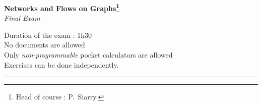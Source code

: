 \documentclass[12pt,a4paper]{article}
\begin{document}
\begin{center}

  {\Large \textbf{Networks and Flows on Graphs\footnote{Head of course : P.~Siarry.}}}\\

  \vspace{10pt}
  {\Large \textit{Final Exam}}

  \vspace{2\baselineskip}
\end{center}
\begin{center}
\begin{minipage}{\textwidth}
  Duration of the exam : 1h30\\
  No documents are allowed\\
  Only \emph{non-programmable} pocket calculators are allowed\\
  Exercises can be done independently.
\end{minipage}
\end{center}
\rule{\textwidth}{2pt}


\vspace{\baselineskip}
\end{document}
